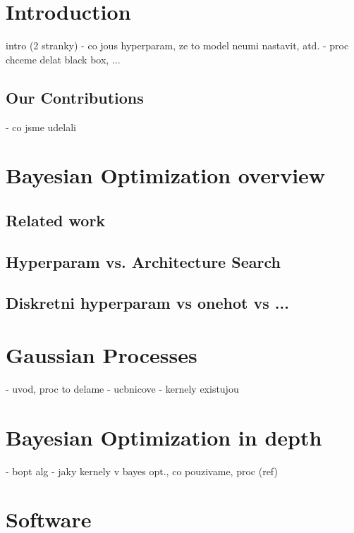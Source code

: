 \chapter{Introduction}

intro (2 stranky)
  - co jous hyperparam, ze to model neumi nastavit, atd.
  - proc chceme delat black box, ...



\section{Our Contributions}
- co jsme udelali


\chapter{Bayesian Optimization overview}



\section{Related work}
\section{Hyperparam vs. Architecture Search}
\section{Diskretni hyperparam vs onehot vs ...}

\chapter{Gaussian Processes}

- uvod, proc to delame
- ucbnicove
- kernely existujou




\chapter{Bayesian Optimization in depth}

- bopt alg
- jaky kernely v bayes opt., co pouzivame, proc (ref)




\chapter{Software}


